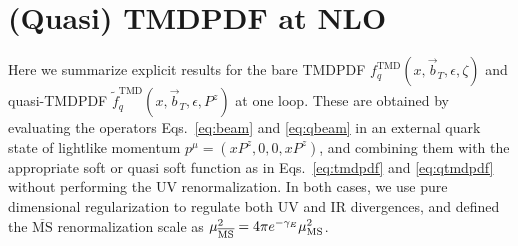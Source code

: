 \documentclass[prd,aps,twocolumn,bibnotes,nofootinbib,preprintnumbers,floatfix]{revtex4-1}
\DeclareRobustCommand{\eqs}[2]{Eqs.~\eqref{eq:#1} and \eqref{eq:#2}}
\newcommand{\eps}{\epsilon}
\newcommand{\bt}{\vec b_T}
\newcommand{\MS}{\overline{\mathrm{MS}}}
\newcommand\TMD{\mathrm{TMD}}
\begin{document}
\appendix

\section{(Quasi) TMDPDF at NLO}
\label{app:tmd_nlo}

Here we summarize explicit results for the bare  TMDPDF $f^\TMD_q(x,\bt,\eps,\zeta)$
and quasi-TMDPDF $\tilde f^\TMD_q(x,\bt,\eps,P^z)$ at one loop. These are
obtained by evaluating the operators \eqs{beam}{qbeam} in an external quark state
of lightlike momentum $p^\mu = (xP^z, 0, 0, xP^z)$, and
combining them with the appropriate soft or quasi soft function as in
\eqs{tmdpdf}{qtmdpdf} without performing the UV renormalization.
In both cases, we use pure dimensional regularization to regulate both UV and IR divergences,
and defined the $\MS$ renormalization scale as $\mu^2_{\MS} = 4\pi e^{-\gamma_E} \mu^2_{\rm MS}$.
\end{document}
